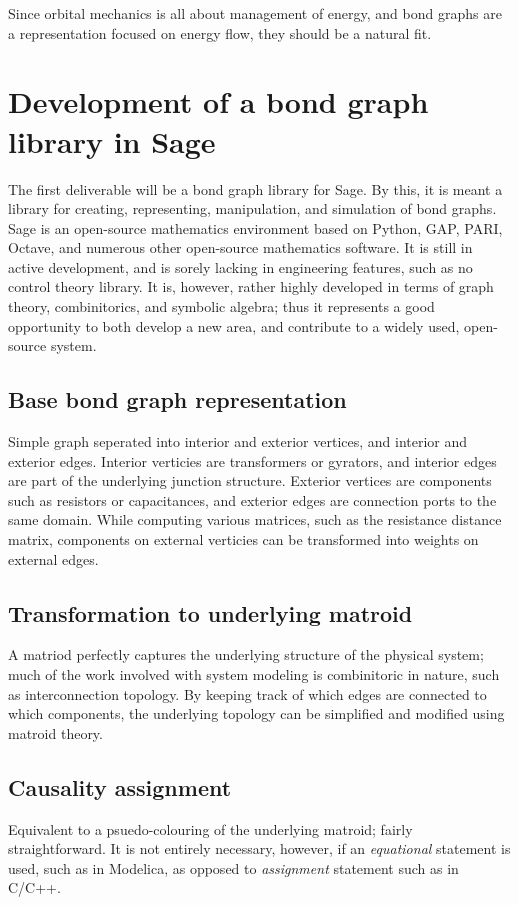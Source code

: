 \documentclass[utf,a4paper,12pt]{report}
\begin{document}
Since orbital mechanics is all about management of energy, and bond graphs are a representation focused on energy flow, they should be a natural fit.
\section{Development of a bond graph library in Sage}
The first deliverable will be a bond graph library for Sage. By this, it is meant a library for creating, representing, manipulation, and simulation of bond graphs.
Sage is an open-source mathematics environment based on Python, GAP, PARI, Octave, and numerous other open-source mathematics software. It is still in active development, and is sorely lacking in engineering features, such as no control theory library. It is, however, rather highly developed in terms of graph theory, combinitorics, and symbolic algebra; thus it represents a good opportunity to both develop a new area, and contribute to a widely used, open-source system.
\subsection{Base bond graph representation}
Simple graph seperated into interior and exterior vertices, and interior and exterior edges. Interior verticies are transformers or gyrators, and interior edges are part of the underlying junction structure. Exterior vertices are components such as resistors or capacitances, and exterior edges are connection ports to the same domain. While computing various matrices, such as the resistance distance matrix, components on external verticies can be transformed into weights on external edges.
\subsection{Transformation to underlying matroid}
A matriod perfectly captures the underlying structure of the physical system; much of the work involved with system modeling is combinitoric in nature, such as interconnection topology. By keeping track of which edges are connected to which components, the underlying topology can be simplified and modified using matroid theory.
\subsection{Causality assignment}
Equivalent to a psuedo-colouring of the underlying matroid; fairly straightforward. It is not entirely necessary, however, if an \emph{equational} statement is used, such as in Modelica, as opposed to \emph{assignment} statement such as in C/C++.
\end{document}
